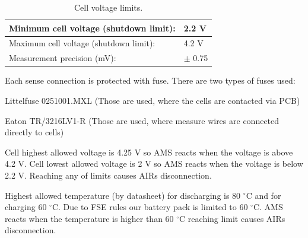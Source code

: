 \begin{table}[H]
	\centering
	\caption{Cell voltage limits.}
	\begin{tabularx}{\textwidth}{|X|X|}
		\hline
		Minimum cell voltage (shutdown limit): & 2.2 V \\[\TableSize]
		\hline
		Maximum cell voltage (shutdown limit): & 4.2 V \\[\TableSize]
		\hline
		Measurement precision (mV): & $\pm$ 0.75 \\[\TableSize]
		\hline
	\end{tabularx}%
	\label{tab:acc-limits}%
\end{table}%

Each sense connection is protected with fuse. There are two types of fuses used: 

\noindent Littelfuse 0251001.MXL (Those are used, where the cells are contacted via PCB)

\noindent Eaton TR/3216LV1-R (Those are used, where measure wires are connected directly to cells)

Cell highest allowed voltage is 4.25 V so AMS reacts when the voltage is above 4.2 V. Cell lowest allowed voltage is 2 V so AMS reacts when the voltage is below 2.2 V. Reaching any of limits causes AIRs disconnection.

Highest allowed temperature (by datasheet) for discharging is 80 $^\circ$C and for charging 60 $^\circ$C. Due to FSE rules our battery pack is limited to 60 $^\circ$C. AMS reacts when the temperature is higher than 60 $^\circ$C reaching limit causes AIRs disconnection.

